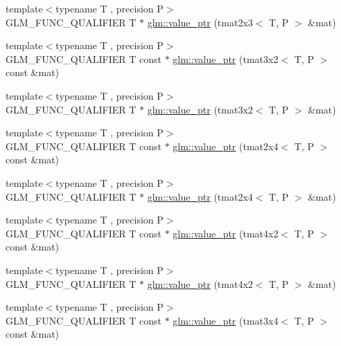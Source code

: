 \begin{DoxyCompactItemize}
\item 
{\footnotesize template$<$typename T , precision P$>$ }\\G\+L\+M\+\_\+\+F\+U\+N\+C\+\_\+\+Q\+U\+A\+L\+I\+F\+I\+E\+R T $\ast$ \hyperlink{group__gtc__type__ptr_ga36fb9a17664c8b6848a5d005e4068a2f}{glm\+::value\+\_\+ptr} (tmat2x3$<$ T, P $>$ \&mat)
\item 
{\footnotesize template$<$typename T , precision P$>$ }\\G\+L\+M\+\_\+\+F\+U\+N\+C\+\_\+\+Q\+U\+A\+L\+I\+F\+I\+E\+R T const $\ast$ \hyperlink{group__gtc__type__ptr_ga398202d6ce304deb7da50badde85ee41}{glm\+::value\+\_\+ptr} (tmat3x2$<$ T, P $>$ const \&mat)
\item 
{\footnotesize template$<$typename T , precision P$>$ }\\G\+L\+M\+\_\+\+F\+U\+N\+C\+\_\+\+Q\+U\+A\+L\+I\+F\+I\+E\+R T $\ast$ \hyperlink{group__gtc__type__ptr_gad6a737f57febdef255873f6a44d0db0e}{glm\+::value\+\_\+ptr} (tmat3x2$<$ T, P $>$ \&mat)
\item 
{\footnotesize template$<$typename T , precision P$>$ }\\G\+L\+M\+\_\+\+F\+U\+N\+C\+\_\+\+Q\+U\+A\+L\+I\+F\+I\+E\+R T const $\ast$ \hyperlink{group__gtc__type__ptr_ga2336cd68e72b0d295c8cd33eb1588480}{glm\+::value\+\_\+ptr} (tmat2x4$<$ T, P $>$ const \&mat)
\item 
{\footnotesize template$<$typename T , precision P$>$ }\\G\+L\+M\+\_\+\+F\+U\+N\+C\+\_\+\+Q\+U\+A\+L\+I\+F\+I\+E\+R T $\ast$ \hyperlink{group__gtc__type__ptr_ga0d745a55255710933effd6391307f681}{glm\+::value\+\_\+ptr} (tmat2x4$<$ T, P $>$ \&mat)
\item 
{\footnotesize template$<$typename T , precision P$>$ }\\G\+L\+M\+\_\+\+F\+U\+N\+C\+\_\+\+Q\+U\+A\+L\+I\+F\+I\+E\+R T const $\ast$ \hyperlink{group__gtc__type__ptr_ga1de002422f32c6da9d65d3f257f37196}{glm\+::value\+\_\+ptr} (tmat4x2$<$ T, P $>$ const \&mat)
\item 
{\footnotesize template$<$typename T , precision P$>$ }\\G\+L\+M\+\_\+\+F\+U\+N\+C\+\_\+\+Q\+U\+A\+L\+I\+F\+I\+E\+R T $\ast$ \hyperlink{group__gtc__type__ptr_ga0e62660f9066864568cd74d76d528a6e}{glm\+::value\+\_\+ptr} (tmat4x2$<$ T, P $>$ \&mat)
\item 
{\footnotesize template$<$typename T , precision P$>$ }\\G\+L\+M\+\_\+\+F\+U\+N\+C\+\_\+\+Q\+U\+A\+L\+I\+F\+I\+E\+R T const $\ast$ \hyperlink{group__gtc__type__ptr_gacbf08ea2313cad8a42652d4455e69709}{glm\+::value\+\_\+ptr} (tmat3x4$<$ T, P $>$ const \&mat)

\end{DoxyCompactItemize}
